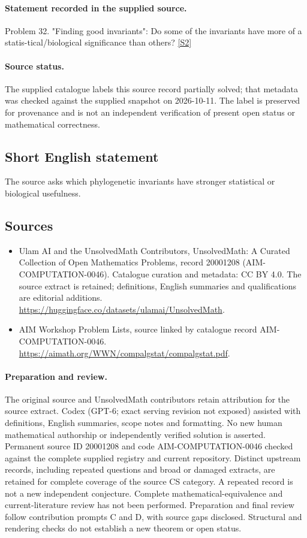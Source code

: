 \documentclass[11pt]{article}
\begin{document}
\paragraph{Statement recorded in the supplied source.}
Problem 32. "Finding good invariants": Do some of the invariants have more of a statis-tical/biological significance than others? \href{https://aimath.org/WWN/compalgstat/compalgstat.pdf}{[S2]}
\paragraph{Source status.}
The supplied catalogue labels this source record partially solved; that metadata was checked against the supplied snapshot on 2026-10-11. The label is preserved for provenance and is not an independent verification of present open status or mathematical correctness.
\subsection{Short English statement}
The source asks which phylogenetic invariants have stronger statistical or biological usefulness.
\subsection{Sources}
\begin{itemize}
\item[S1] Ulam AI and the UnsolvedMath Contributors, UnsolvedMath: A Curated Collection of Open Mathematics Problems, record 20001208 (AIM-COMPUTATION-0046). Catalogue curation and metadata: CC BY 4.0. The source extract is retained; definitions, English summaries and qualifications are editorial additions.
\url{https://huggingface.co/datasets/ulamai/UnsolvedMath}.
\item[S2] AIM Workshop Problem Lists, source linked by catalogue record AIM-COMPUTATION-0046.
\url{https://aimath.org/WWN/compalgstat/compalgstat.pdf}.
\end{itemize}
\paragraph{Preparation and review.}
The original source and UnsolvedMath contributors retain attribution for the source extract. Codex (GPT-6; exact serving revision not exposed) assisted with definitions, English summaries, scope notes and formatting. No new human mathematical authorship or independently verified solution is asserted. Permanent source ID 20001208 and code AIM-COMPUTATION-0046 checked against the complete supplied registry and current repository. Distinct upstream records, including repeated questions and broad or damaged extracts, are retained for complete coverage of the source CS category. A repeated record is not a new independent conjecture. Complete mathematical-equivalence and current-literature review has not been performed. Preparation and final review follow contribution prompts C and D, with source gaps disclosed. Structural and rendering checks do not establish a new theorem or open status.
\label{end:20001208}
\end{document}
